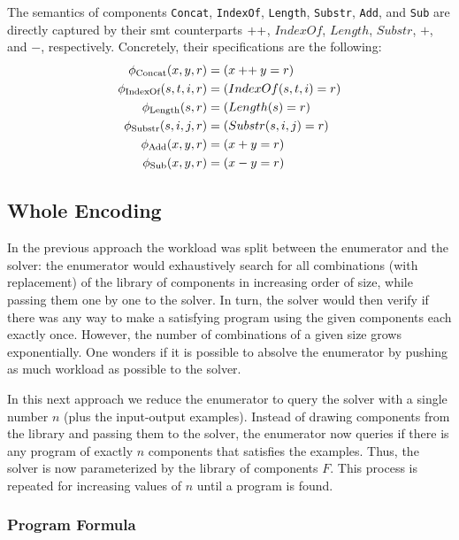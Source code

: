 The semantics of components \lstinline{Concat}, \lstinline{IndexOf},
\lstinline{Length}, \lstinline{Substr}, \lstinline{Add}, and \lstinline{Sub}
are directly captured by their \gls{smt} counterparts $\mathbin{++}$, $IndexOf$,
$Length$, $Substr$, $+$, and $-$, respectively.
Concretely, their specifications are the following:
%
\begin{align*}
  \phi{}_{\text{\lstinline{Concat}}}(x, y, r)     &= (x \strconcat y   = r) \\
  \phi{}_{\text{\lstinline{IndexOf}}}(s, t, i, r) &= (IndexOf(s, t, i) = r) \\
  \phi{}_{\text{\lstinline{Length}}}(s, r)        &= (Length(s)        = r) \\
  \phi{}_{\text{\lstinline{Substr}}}(s, i, j, r)  &= (Substr(s, i, j)  = r) \\
  \phi{}_{\text{\lstinline{Add}}}(x, y, r)        &= (x + y            = r) \\
  \phi{}_{\text{\lstinline{Sub}}}(x, y, r)        &= (x - y            = r)
\end{align*}

\subsection{Whole Encoding}
\label{sec:whole-encoding}

In the previous approach the workload was split between the enumerator and the
solver: the enumerator would exhaustively search for all combinations (with
replacement) of the library of components in increasing order of size, while
passing them one by one to the solver. In turn, the solver would then verify if
there was any way to make a satisfying program using the given components each
exactly once. However, the number of combinations of a given size grows
exponentially. One wonders if it is possible to absolve the enumerator by
pushing as much workload as possible to the solver.

In this next approach we reduce the enumerator to query the solver with a single
number $n$ (plus the input-output examples). Instead of drawing components from the
library and passing them to the solver, the enumerator now queries if there is 
any program of exactly $n$ components that satisfies the examples. Thus, the
solver is now parameterized by the library of components $F$. This process is
repeated for increasing values of $n$ until a program is found.

\subsubsection{Program Formula}
\label{sec:program-formula-whole}

